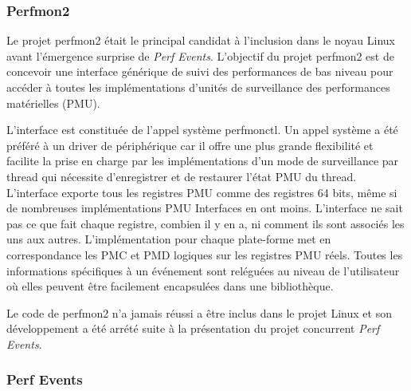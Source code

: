    
    \subsubsection{Perfmon2}
        Le projet perfmon2 était le principal candidat à l'inclusion dans le noyau Linux avant l'émergence surprise de \textit{Perf Events}. L'objectif du projet perfmon2 est de concevoir une interface générique de suivi des performances de bas niveau pour accéder à toutes les implémentations d'unités de surveillance des performances matérielles (PMU).
        
        L'interface est constituée de l'appel système perfmonctl. Un appel système a été préféré à un driver de périphérique car il offre une plus grande flexibilité et facilite la prise en charge par les implémentations d'un mode de surveillance par thread qui nécessite d'enregistrer et de restaurer l'état PMU du thread. L'interface exporte tous les registres PMU comme des registres 64 bits, même si de nombreuses implémentations PMU Interfaces en ont moins. L'interface ne sait pas ce que fait chaque registre, combien il y en a, ni comment ils sont associés les uns aux autres. L'implémentation pour chaque plate-forme met en correspondance les PMC et PMD logiques sur les registres PMU réels. Toutes les informations spécifiques à un événement sont reléguées au niveau de l'utilisateur où elles peuvent être facilement encapsulées dans une bibliothèque.
    
        Le code de perfmon2 n'a jamais réussi a être inclus dans le projet Linux et son développement a été arrété suite à la présentation du projet concurrent \textit{Perf Events}.
    
    
    
    \subsubsection{Perf Events}
        
